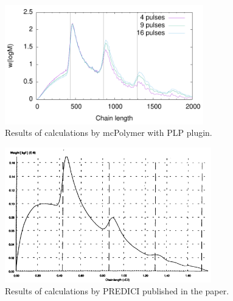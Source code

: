 \documentclass{article}
\begin{document}
\begin{figure}[h]
\centering
\includegraphics[width=0.77\textwidth]{plp_example3.pdf}
\caption{Results of calculations by mcPolymer with PLP plugin.}
\end{figure}

\begin{figure}[h]
\centering
\includegraphics[width=0.8\textwidth]{Wulkow1996_PLP.png}
\caption{Results of calculations by PREDICI published in the paper.}
\end{figure}
\end{document}
